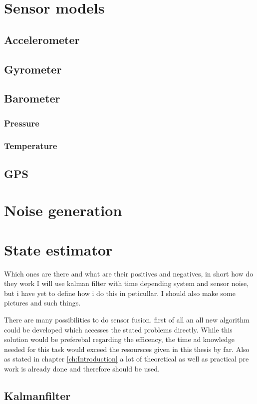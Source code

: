   
  \section{Sensor models}
  \subsection{Accelerometer}
  \subsection{Gyrometer}
  \subsection{Barometer}
  \subsubsection{Pressure}
  \subsubsection{Temperature}
  \subsection{GPS}
  
  
  \section{Noise generation}
  
  \section{State estimator}
  Which ones are there and what are their positives and negatives, in short how do they work
  I will use kalman filter with time depending system and sensor noise, but i have yet to define how i do this in peticullar.
  I should also make some pictures and such things.
  
  There are many possibilities to do sensor fusion. first of all an all new algorithm could be developed which accesses the 
  stated problems directly. While this solution would be preferebal regarding the efficency, the 
  time ad knowledge needed for this task would exceed the resoursces given in this thesis by far.
  Also as stated in chapter \ref{ch:Introduction} a lot of theoretical as well as practical pre work is
  already done and therefore should be used. 
  
  \subsection{Kalmanfilter}
  
